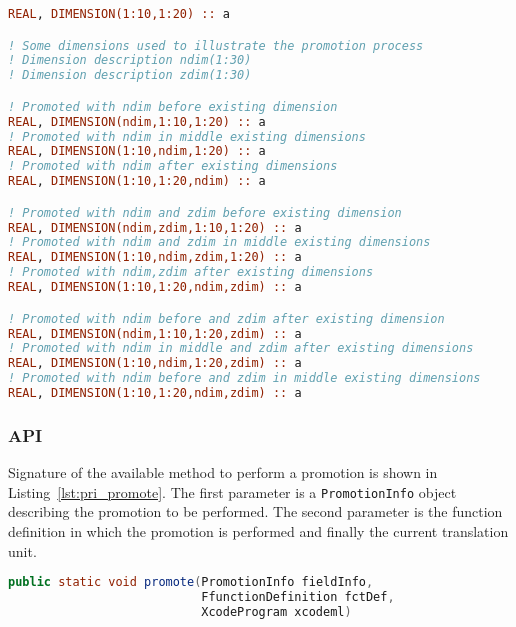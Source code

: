 \begin{lstlisting}[language=fortran]
REAL, DIMENSION(1:10,1:20) :: a

! Some dimensions used to illustrate the promotion process
! Dimension description ndim(1:30)
! Dimension description zdim(1:30)

! Promoted with ndim before existing dimension
REAL, DIMENSION(ndim,1:10,1:20) :: a
! Promoted with ndim in middle existing dimensions
REAL, DIMENSION(1:10,ndim,1:20) :: a
! Promoted with ndim after existing dimensions
REAL, DIMENSION(1:10,1:20,ndim) :: a

! Promoted with ndim and zdim before existing dimension
REAL, DIMENSION(ndim,zdim,1:10,1:20) :: a
! Promoted with ndim and zdim in middle existing dimensions
REAL, DIMENSION(1:10,ndim,zdim,1:20) :: a
! Promoted with ndim,zdim after existing dimensions
REAL, DIMENSION(1:10,1:20,ndim,zdim) :: a

! Promoted with ndim before and zdim after existing dimension
REAL, DIMENSION(ndim,1:10,1:20,zdim) :: a
! Promoted with ndim in middle and zdim after existing dimensions
REAL, DIMENSION(1:10,ndim,1:20,zdim) :: a
! Promoted with ndim before and zdim in middle existing dimensions
REAL, DIMENSION(1:10,1:20,ndim,zdim) :: a
\end{lstlisting}

\subsubsection{API}
Signature of the available method to perform a promotion is shown in 
Listing~\ref{lst:pri_promote}. The first parameter is a 
\lstinline|PromotionInfo| object describing the promotion to be performed. The
second parameter is the function definition in which the promotion is performed 
and finally the current translation unit.

\begin{lstlisting}[label=lst:pri_promote, language=java,
  title=Field.java - promote]
public static void promote(PromotionInfo fieldInfo, 
                           FfunctionDefinition fctDef,
                           XcodeProgram xcodeml)
\end{lstlisting}